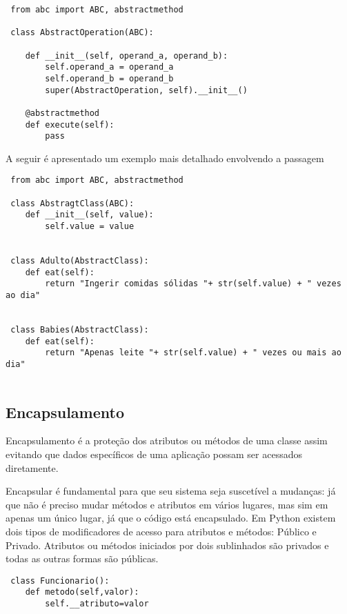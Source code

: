 \documentclass[11pt,a4paper]{article}
\begin{document}
% 

\begin{lstlisting}
 from abc import ABC, abstractmethod 
 
 class AbstractOperation(ABC):
 
	def __init__(self, operand_a, operand_b):
		self.operand_a = operand_a
		self.operand_b = operand_b
		super(AbstractOperation, self).__init__()
    
	@abstractmethod
	def execute(self):
		pass
	\end{lstlisting}
	
\vspace{0.9in}

A seguir é apresentado um exemplo mais detalhado envolvendo a passagem 

 \begin{lstlisting}
 from abc import ABC, abstractmethod
     
 class AbstragtClass(ABC): 
	def __init__(self, value):
		self.value = value
         
         
 class Adulto(AbstractClass):         
	def eat(self):
		return "Ingerir comidas sólidas "+ str(self.value) + " vezes ao dia"
 
 
 class Babies(AbstractClass):         
	def eat(self):
		return "Apenas leite "+ str(self.value) + " vezes ou mais ao dia"
 
 \end{lstlisting}


\subsection{Encapsulamento}
Encapsulamento é a proteção dos atributos ou métodos de uma classe assim evitando 
que dados específicos de uma aplicação possam ser acessados diretamente.

Encapsular é fundamental para que seu sistema seja suscetível a mudanças: já que não é preciso mudar
métodos e atributos em vários lugares, mas sim em apenas um único lugar, já que o código está encapsulado.
Em Python existem dois tipos de modificadores de acesso para atributos e métodos: Público e Privado.
Atributos ou métodos iniciados por dois sublinhados são privados e todas as outras formas são públicas.
\begin{lstlisting}
 class Funcionario():
	def metodo(self,valor):
		self.__atributo=valor

\end{lstlisting} 
\end{document}
